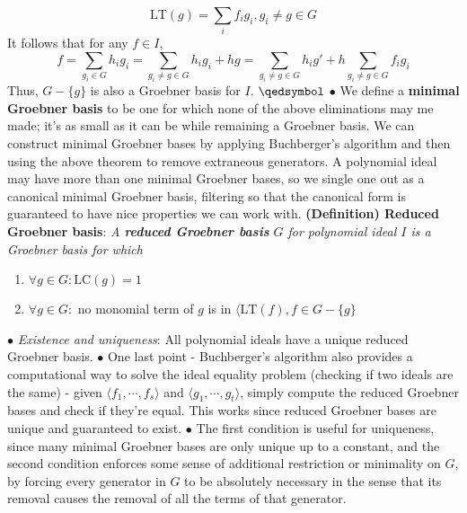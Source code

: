 \documentclass{article}
\begin{document}
$$ \text{LT}(g) = \sum_i f_i g_i, g_i \neq g \in G $$
It follows that for any $ f \in I $,
$$ f = \sum_{g_i \in G} h_i g_i = \sum_{g_i \neq g \in G} h_i g_i + h g = \sum_{g_i \neq g \in G} h_i g' + h \sum_{g_i \neq g \in G} f_i g_i $$
Thus, $ G - \{ g \} $ is also a Groebner basis for $ I $. $ \qedsymbol $
\newline
\indent $ \bullet $ We define a \textbf{minimal Groebner basis} to be one for which none of the above eliminations may me made; it's as small as it can be while remaining a Groebner basis. We can construct minimal Groebner bases by applying Buchberger's algorithm and then using the above theorem to remove extraneous generators.
\newline \newline
A polynomial ideal may have more than one minimal Groebner bases, so we single one out as a canonical minimal Groebner basis, filtering so that the canonical form is guaranteed to have nice properties we can work with.
\newline \newline
\textbf{(Definition) Reduced Groebner basis}: \textit{A \textbf{reduced Groebner basis} $ G $ for polynomial ideal $ I $ is a Groebner basis for which}
\begin{enumerate}
	\item $ \forall g \in G: \text{LC}(g) = 1 $
	\item $ \forall g \in G: $ 	no monomial term of $ g $ is in $ \langle \text{LT}(f), f \in G - \{ g \} $
\end{enumerate}
\indent $ \bullet $ \textit{Existence and uniqueness}: All polynomial ideals have a unique reduced Groebner basis.
\newline
\indent \indent $ \bullet $ One last point - Buchberger's algorithm also provides a computational way to solve the ideal equality problem (checking if two ideals are the same) - given $ \langle f_1, \cdots, f_s \rangle $ and $ \langle g_1, \cdots, g_t \rangle $, simply compute the reduced Groebner bases and check if they're equal. This works since reduced Groebner bases are unique and guaranteed to exist.
\newline
\indent $ \bullet $ The first condition is useful for uniqueness, since many minimal Groebner bases are only unique up to a constant, and the second condition enforces some sense of additional restriction or minimality on $ G $, by forcing every generator in $ G $ to be absolutely necessary in the sense that its removal causes the removal of all the terms of that generator.
\end{document}
